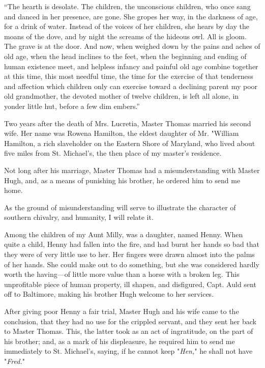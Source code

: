 ``The hearth is desolate. The children, the unconscious children, who
once sang and danced in her presence, are gone. She gropes her way, in
the darkness of age, for a drink of water. Instead of the voices of her
children, she hears by day the moans of the dove, and by night the
screams of the hideous owl. All is gloom. The grave is at the door. And
now, when weighed down by the pains and aches of old age, when the head
inclines to the feet, when the beginning and ending of human existence
meet, and helpless infancy and painful old age combine together at this
time, this most needful time, the time for the exercise of that
tenderness and affection which children only can exercise toward a
declining parent my poor old grandmother, the devoted mother of twelve
children, is left all alone, in yonder little hut, before a few dim
embers.''

Two years after the death of Mrs. Lucretia, Master Thomas married his
second wife. Her name was Rowena Hamilton, the eldest daughter of Mr.
"William Hamilton, a rich slaveholder on the Eastern Shore of Maryland,
who lived about five miles from St. Michael's, the then place of my
master's residence.

Not long after his marriage, Master Thomas had a {}misunderstanding with
Master Hugh, and, as a means of punishing his brother, he ordered him to
send me home.

As the ground of misunderstanding will serve to illustrate the character
of southern chivalry, and humanity, I will relate it.

Among the children of my Aunt Milly, was a daughter, named Henny. When
quite a child, Henny had fallen into the fire, and had burnt her hands
so bad that they were of very little use to her. Her fingers were drawn
almost into the palms of her hands. She could make out to do something,
but she was considered hardly worth the having---of little more value
than a horse with a broken leg. This unprofitable piece of human
property, ill shapen, and disfigured, Capt. Auld sent off to Baltimore,
making his brother Hugh welcome to her services.

After giving poor Henny a fair trial, Master Hugh and his wife came to
the conclusion, that they had no use for the crippled servant, and they
sent her back to Master Thomas. This, the latter took as an act of
ingratitude, on the part of his brother; and, as a mark of his
displeasure, he required him to send me immediately to St. Michael's,
saying, if he cannot keep "\emph{Hen,}" he shall not have "\emph{Fred.}"

